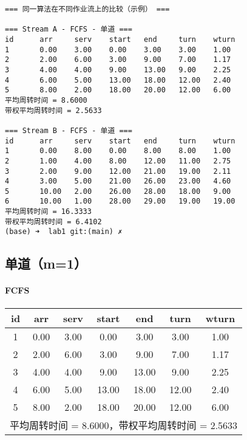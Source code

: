 \documentclass[12pt,hyperref,a4paper,UTF8]{ctexart}
\begin{document}
\begin{verbatim}
=== 同一算法在不同作业流上的比较（示例） ===

=== Stream A - FCFS - 单道 ===
id      arr     serv    start   end     turn    wturn
1       0.00    3.00    0.00    3.00    3.00    1.00
2       2.00    6.00    3.00    9.00    7.00    1.17
3       4.00    4.00    9.00    13.00   9.00    2.25
4       6.00    5.00    13.00   18.00   12.00   2.40
5       8.00    2.00    18.00   20.00   12.00   6.00
平均周转时间 = 8.6000
带权平均周转时间 = 2.5633

=== Stream B - FCFS - 单道 ===
id      arr     serv    start   end     turn    wturn
1       0.00    8.00    0.00    8.00    8.00    1.00
2       1.00    4.00    8.00    12.00   11.00   2.75
3       2.00    9.00    12.00   21.00   19.00   2.11
4       3.00    5.00    21.00   26.00   23.00   4.60
5       10.00   2.00    26.00   28.00   18.00   9.00
6       10.00   1.00    28.00   29.00   19.00   19.00
平均周转时间 = 16.3333
带权平均周转时间 = 6.4102
(base) ➜  lab1 git:(main) ✗ 
\end{verbatim}

\subsection{单道（m=1）}
\paragraph{FCFS}
\begin{table}[!htbp]
\centering
\begin{tabular}{c|c|c|c|c|c|c}
id & arr & serv & start & end & turn & wturn \\
\hline
1 & 0.00 & 3.00 & 0.00 & 3.00 & 3.00 & 1.00 \\
2 & 2.00 & 6.00 & 3.00 & 9.00 & 7.00 & 1.17 \\
3 & 4.00 & 4.00 & 9.00 & 13.00 & 9.00 & 2.25 \\
4 & 6.00 & 5.00 & 13.00 & 18.00 & 12.00 & 2.40 \\
5 & 8.00 & 2.00 & 18.00 & 20.00 & 12.00 & 6.00 \\
\hline
\multicolumn{7}{r}{\small 平均周转时间 = 8.6000，带权平均周转时间 = 2.5633}
\end{tabular}
\end{table}
\end{document}
